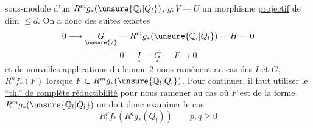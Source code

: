 sous-module  d'un \(R^mg_*(\unsure{\mathbb Q_l|Q_l})\),
\(g:V\mathbin{\text{---}}U\) un morphisme \uline{projectif} de dim
 \(\le d\).
On a donc des suites exactes
\[
0\longrightarrow \underset{\unsure{/}}{G}\mathbin{\text{---}}
R^mg_*(\unsure{\mathbb Q_l|Q_l})\mathbin{\text{---}}H\mathbin{\text{---}}0
\]
\[
0\mathbin{\text{---}}\underset{*}{I}\mathbin{\text{---}}
\underset{*}{G}\mathbin{\text{---}}F\longrightarrow0
\]
et \uline{de} nouvelles applications du lemme 2 nous ramènent au cas des \(I\) et \(G\),
\(R^nf_*(F)\) lorsque 
\(F\)  \(\subset R^mg_*(\unsure{\mathbb Q_l|Q_l})\).
Pour continuer, il faut utiliser le
\uline{``th.'' de complète réductibilité}
pour nous ramener au cas où \(F\) est de la forme \(R^mg_*(\unsure{\mathbb Q_l|Q_l})\)
on doit donc examiner le cas
\[
R^p_!f_*(R^qg_*(Q_l))\qquad p,q\ge0
\]

